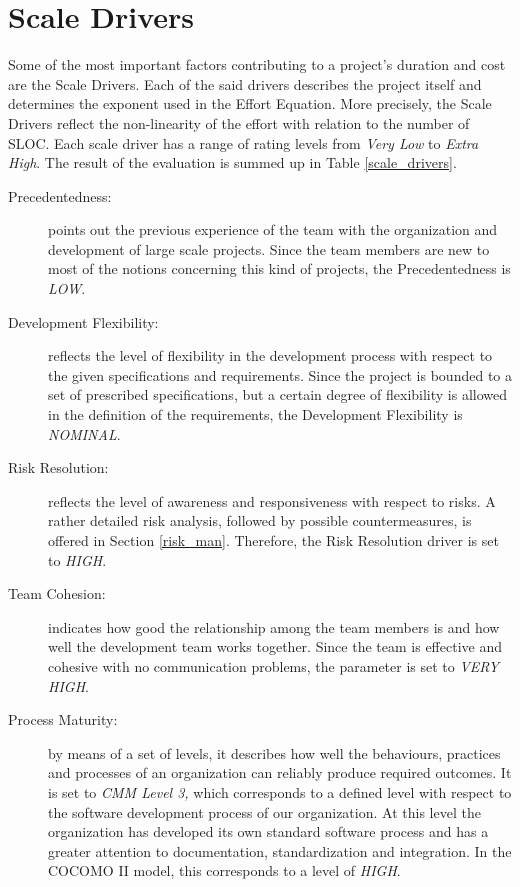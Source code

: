 \section{Scale Drivers}
Some of the most important factors contributing to a project's duration and cost are the Scale Drivers. Each of the said drivers describes the project itself and determines the exponent used in the Effort Equation. More precisely, the Scale Drivers reflect the non-linearity of the effort with relation to the number of SLOC. Each scale driver has a range of rating levels from \textit{Very Low} to \textit{Extra High}. The result of the evaluation is summed up in Table \ref{scale_drivers}.

\begin{description}
\item[Precedentedness:] points out the previous experience of the team with the organization and development of large scale projects. Since the team members are new to most of the notions concerning this kind of projects, the Precedentedness is \textit{LOW}.
\item[Development Flexibility:] reflects the level of flexibility in the development process with respect to the given specifications and requirements. Since the project is bounded to a set of prescribed specifications, but a certain degree of flexibility is allowed in the definition of the requirements, the Development Flexibility is \textit{NOMINAL}.
\item[Risk Resolution:] reflects the level of awareness and responsiveness with respect to risks. A rather detailed risk analysis, followed by possible countermeasures, is offered in Section \ref{risk_man}. Therefore, the Risk Resolution driver is set to \textit{HIGH}.
\item[Team Cohesion:] indicates how good the relationship among the team members is and how well the development team works together. Since the team is effective and cohesive with no communication problems, the parameter is set to \textit{VERY HIGH}.
\item[Process Maturity:] by means of a set of levels, it describes how well the behaviours, practices and processes of an organization can reliably produce required outcomes. It is set to \textit{CMM Level 3,} which corresponds to a defined level with respect to the software development process of our organization. At this level the organization has developed its own standard software process and has a greater attention to documentation, standardization and integration. In the COCOMO II model, this corresponds to a level of \textit{HIGH}.
\end{description}

